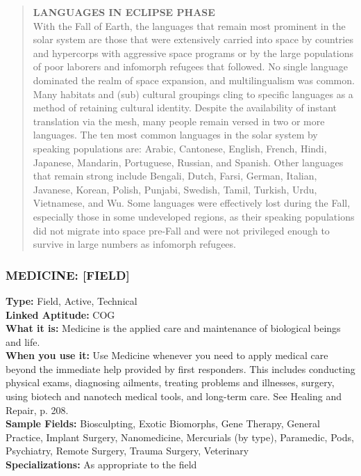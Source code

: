 \begin{quotation} \textbf{LANGUAGES IN ECLIPSE PHASE} \\ With the Fall of Earth, the languages that remain most prominent in the solar system are those that were extensively carried into space by countries and hypercorps with aggressive space programs or by the large populations of poor laborers and infomorph refugees that followed. No single language dominated the realm of space expansion, and multilingualism was common. Many habitats and (sub) cultural groupings cling to specific languages as a method of retaining cultural identity. Despite the availability of instant translation via the mesh, many people remain versed in two or more languages. The ten most common languages in the solar system by speaking populations are: Arabic, Cantonese, English, French, Hindi, Japanese, Mandarin, Portuguese, Russian, and Spanish. Other languages that remain strong include Bengali, Dutch, Farsi, German, Italian, Javanese, Korean, Polish, Punjabi, Swedish, Tamil, Turkish, Urdu, Vietnamese, and Wu. Some languages were effectively lost during the Fall, especially those in some undeveloped regions, as their speaking populations did not migrate into space pre-Fall and were not privileged enough to survive in large numbers as infomorph refugees. \end{quotation} 





\subsubsection{MEDICINE: [FIELD]} \textbf{Type:} Field, Active, Technical \\ \textbf{Linked Aptitude:} COG \\ \textbf{What it is:} Medicine is the applied care and maintenance of biological beings and life. \\ \textbf{When you use it:} Use Medicine whenever you need to apply medical care beyond the immediate help provided by first responders. This includes conducting physical exams, diagnosing ailments, treating problems and illnesses, surgery, using biotech and nanotech medical tools, and long-term care. See Healing and Repair, p. 208. \\ \textbf{Sample Fields:} Biosculpting, Exotic Biomorphs, Gene Therapy, General Practice, Implant Surgery, Nanomedicine, Mercurials (by type), Paramedic, Pods, Psychiatry, Remote Surgery, Trauma Surgery, Veterinary \\ \textbf{Specializations:} As appropriate to the field 

